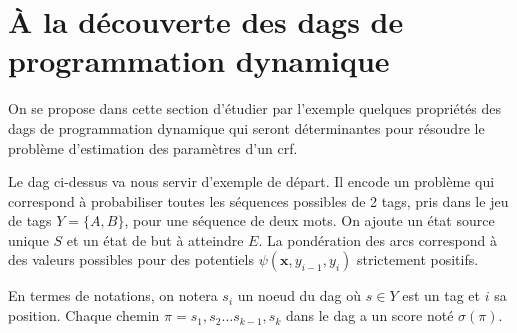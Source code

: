 \documentclass[11pt,openany]{book}
\newcommand{\ac}[1]{{\sc #1}} %
\begin{document}
\section{\`A la découverte des \ac{dag}s de programmation dynamique}

On se propose dans cette section d'étudier par l'exemple quelques propriétés des \ac{dags}
de programmation dynamique qui seront déterminantes pour résoudre le problème d'estimation des paramètres d'un \ac{crf}. 
\begin{center}
\end{center}
Le \ac{dag} ci-dessus va nous servir d'exemple de départ. Il encode un problème qui correspond à  probabiliser toutes les séquences possibles de 2 tags, pris dans le jeu de tags $Y=\{A,B\}$, pour une séquence de deux mots. On ajoute un état source unique $S$ et un état de but à atteindre $E$. La pondération des arcs correspond à des valeurs possibles pour des potentiels $\psi(\mathbf{x},y_{i-1},y_{i})$ strictement positifs.
 
En termes de notations, on notera $s_i$ un noeud du \ac{dag} où $s\in Y$ est un tag et $i$ sa position. Chaque chemin $\pi = s_1,s_2\ldots s_{k-1},s_k$ dans le \ac{dag} a un score noté $\sigma(\pi)$.  

\end{document}
